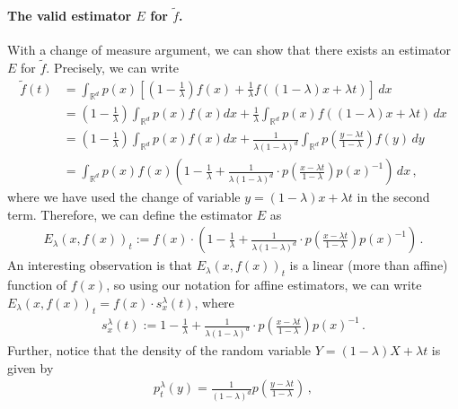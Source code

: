 \documentclass{article}
\theoremstyle{plain}
\theoremstyle{definition}
\theoremstyle{plain}
\newcommand{\Rd}{\mathbb{R}^d}
\begin{document}
\paragraph{The valid estimator $E$ for $\tilde{f}$.}
With a change of measure argument, we can show that there exists an estimator $E$ for $\tilde{f}$.
Precisely, we can write
\begin{align}
    \tilde{f}(t)
     & = \int_{\Rd}
    p(x) \left[
        \left(1 - \frac{1}{\lambda}\right) f(x)
        + \frac{1}{\lambda} f\left(
        (1-\lambda) x + \lambda t
        \right)
    \right]\,dx     \\
     & =
    \left(1 - \frac{1}{\lambda}\right)
    \int_{\Rd}
    p(x)
    f(x)
    dx
    +
    \frac{1}{\lambda}
    \int_{\Rd}
    p(x)
    f\left(
    (1-\lambda) x + \lambda t
    \right) \,dx    \\
     & =
    \left(1 - \frac{1}{\lambda}\right)
    \int_{\Rd}
    p(x)
    f(x)
    dx
    +
    \frac{1}{\lambda (1-\lambda)^d}
    \int_{\Rd}
    p\left(
    \frac{y - \lambda t}{1 - \lambda}
    \right)
    f(y) \,dy       \\
     & =
    \int_{\Rd}
    p(x)
    f(x)
    \left(
    1 - \frac{1}{\lambda}
    +
    \frac{1}{\lambda (1-\lambda)^d}
    \cdot
    p\left(
    \frac{x - \lambda t}{1 - \lambda}
    \right)
    p(x)^{-1}
    \right) \,dx\,,
\end{align}
where we have used the change of variable $y = (1-\lambda)x + \lambda t$ in the second term.
Therefore, we can define the estimator $E$ as
\begin{align}
    E_\lambda(x, f(x))_t := f(x) \cdot \left(1 - \frac{1}{\lambda} + \frac{1}{\lambda (1-\lambda)^d} \cdot p\left(\frac{x - \lambda t}{1 - \lambda}\right) p(x)^{-1}\right)\,.
\end{align}
An interesting observation is that $E_\lambda(x, f(x))_t$ is a linear (more than affine) function of $f(x)$,
so using our notation for affine estimators, we can write $E_\lambda(x, f(x))_t = f(x) \cdot s^\lambda_x(t)$, where
\begin{align}
    s^\lambda_x(t) := 1 - \frac{1}{\lambda} + \frac{1}{\lambda (1-\lambda)^d} \cdot p\left(\frac{x - \lambda t}{1 - \lambda}\right) p(x)^{-1}\,.
\end{align}
Further, notice that the density of the random variable $Y = (1-\lambda)X + \lambda t$ is given by
\begin{align}
    p^\lambda_t(y) = \frac{1}{(1-\lambda)^d} p\left(\frac{y - \lambda t}{1 - \lambda}\right)\,,
\end{align}
\end{document}
